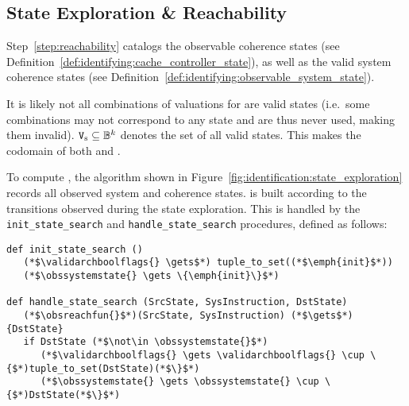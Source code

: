 \subsection{State Exploration \& Reachability}
Step~\ref{step:reachability} catalogs the observable coherence states (see
Definition~\ref{def:identifying:cache_controller_state}), as well as the valid
system coherence states (see
Definition~\ref{def:identifying:observable_system_state}).

\begin{definition}
\label{def:identifying:cache_controller_state}
   It is likely not all combinations of valuations for \archboolflags{} are
   valid states (i.e.~some combinations may not correspond to any state and are
   thus never used, making them invalid). $\text{\texttt{V}\textsubscript{s}}{} \subseteq
   \mathbb{B}{}^{k}{}{}$ denotes the set of all valid states. This makes
   \validarchboolflags{} the codomain of both \cacheboolstatefun{} and
   \coherencemanagerboolstatefun{}.
\end{definition}

\iffalse
\begin{issue}[Cataloging the Valid Observable Coherence States]
\label{issue:catalog_observable_states}
   \validarchboolflags{} is not originally known.
\end{issue}


\begin{issue}[Definition of \obsreachfun{}]
   \label{issue:define_reachability}
   \obsreachfun{} is not originally known.
\end{issue}
\fi

\begin{step}[Reachability]
\label{step:reachability}
   To compute \validarchboolflags{}, the algorithm shown in
   Figure~\ref{fig:identification:state_exploration} records all observed system
   and coherence states.  \obsreachfun{} is built according to the transitions
   observed during the state exploration. This is handled by the
   \lstinline!init_state_search!  and \lstinline!handle_state_search!
   procedures, defined as follows:
\begin{lstlisting}
def init_state_search ()
   (*$\validarchboolflags{} \gets$*) tuple_to_set((*$\emph{init}$*))
   (*$\obssystemstate{} \gets \{\emph{init}\}$*)

def handle_state_search (SrcState, SysInstruction, DstState)
   (*$\obsreachfun{}$*)(SrcState, SysInstruction) (*$\gets$*) {DstState}
   if DstState (*$\not\in \obssystemstate{}$*)
      (*$\validarchboolflags{} \gets \validarchboolflags{} \cup \{$*)tuple_to_set(DstState)(*$\}$*)
      (*$\obssystemstate{} \gets \obssystemstate{} \cup \{$*)DstState(*$\}$*)
\end{lstlisting}
\end{step}

